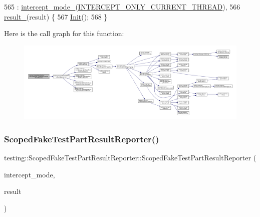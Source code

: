 \begin{DoxyCode}
565     : \hyperlink{classtesting_1_1ScopedFakeTestPartResultReporter_ae62ed825619c11ac21fdd06480e0d982}{intercept\_mode\_}(\hyperlink{classtesting_1_1ScopedFakeTestPartResultReporter_a82f6209b3cf5c4b15ec8bd8041dbc2d5aed6c5f87d33207768db503526e6a1e8a}{INTERCEPT\_ONLY\_CURRENT\_THREAD}),
566       \hyperlink{classtesting_1_1ScopedFakeTestPartResultReporter_a729a26c94e4082ee0dc3312395a3f480}{result\_}(result) \{
567   \hyperlink{classtesting_1_1ScopedFakeTestPartResultReporter_a28d280a3f5d172d63b94f70b8e7660d7}{Init}();
568 \}
\end{DoxyCode}
Here is the call graph for this function\+:
\nopagebreak
\begin{figure}[H]
\begin{center}
\leavevmode
\includegraphics[width=350pt]{classtesting_1_1ScopedFakeTestPartResultReporter_aa0100ecf4799fb51d45167be6a5de1d5_cgraph}
\end{center}
\end{figure}
\mbox{\label{classtesting_1_1ScopedFakeTestPartResultReporter_a57cbc09ed48627c8a73e622618dc4b4f}} 
\subsubsection{\texorpdfstring{Scoped\+Fake\+Test\+Part\+Result\+Reporter()}{ScopedFakeTestPartResultReporter()}\hspace{0.1cm}{\footnotesize\ttfamily [2/2]}}
{\footnotesize\ttfamily testing\+::\+Scoped\+Fake\+Test\+Part\+Result\+Reporter\+::\+Scoped\+Fake\+Test\+Part\+Result\+Reporter (\begin{DoxyParamCaption}\item[{\hyperlink{classtesting_1_1ScopedFakeTestPartResultReporter_a82f6209b3cf5c4b15ec8bd8041dbc2d5}{Intercept\+Mode}}]{intercept\+\_\+mode,  }\item[{\hyperlink{classtesting_1_1TestPartResultArray}{Test\+Part\+Result\+Array} $\ast$}]{result }\end{DoxyParamCaption})}



